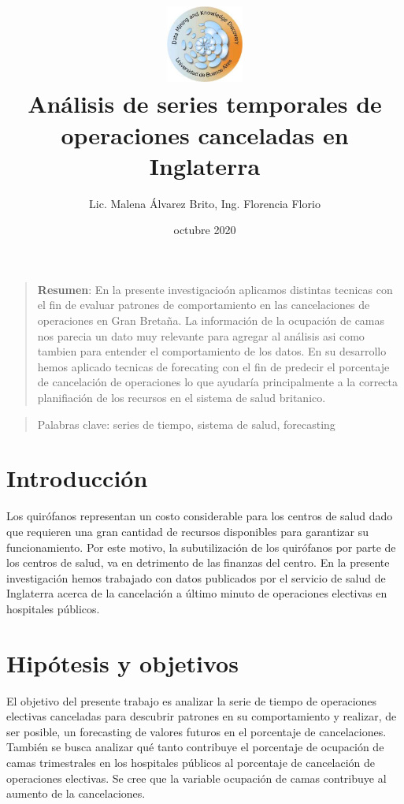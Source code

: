 \documentclass[
]{article}
\title{\includegraphics[width=1in,height=\textheight]{logo_dm_uba.png}\\
Análisis de series temporales de operaciones canceladas en Inglaterra}
\author{Lic. Malena Álvarez Brito, Ing. Florencia Florio}
\date{octubre 2020}
\begin{document}
\maketitle

\begin{quote}
\textbf{Resumen}: En la presente investigacioón aplicamos distintas
tecnicas con el fin de evaluar patrones de comportamiento en las
cancelaciones de operaciones en Gran Bretaña. La información de la
ocupación de camas nos parecia un dato muy relevante para agregar al
análisis asi como tambien para entender el comportamiento de los datos.
En su desarrollo hemos aplicado tecnicas de forecating con el fin de
predecir el porcentaje de cancelación de operaciones lo que ayudaría
principalmente a la correcta planifiación de los recursos en el sistema
de salud britanico.
\end{quote}

\begin{quote}
Palabras clave: series de tiempo, sistema de salud, forecasting
\end{quote}

\hypertarget{introducciuxf3n}{%
\section{Introducción}\label{introducciuxf3n}}

Los quirófanos representan un costo considerable para los centros de
salud dado que requieren una gran cantidad de recursos disponibles para
garantizar su funcionamiento. Por este motivo, la subutilización de los
quirófanos por parte de los centros de salud, va en detrimento de las
finanzas del centro. En la presente investigación hemos trabajado con
datos publicados por el servicio de salud de Inglaterra acerca de la
cancelación a último minuto de operaciones electivas en hospitales
públicos.

\hypertarget{hipuxf3tesis-y-objetivos}{%
\section{Hipótesis y objetivos}\label{hipuxf3tesis-y-objetivos}}

El objetivo del presente trabajo es analizar la serie de tiempo de
operaciones electivas canceladas para descubrir patrones en su
comportamiento y realizar, de ser posible, un forecasting de valores
futuros en el porcentaje de cancelaciones. También se busca analizar qué
tanto contribuye el porcentaje de ocupación de camas trimestrales en los
hospitales públicos al porcentaje de cancelación de operaciones
electivas. Se cree que la variable ocupación de camas contribuye al
aumento de la cancelaciones.
\end{document}
